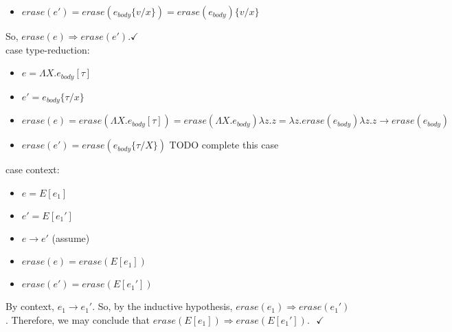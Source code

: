 \documentclass[10pt]{article}
\begin{document}
\begin{exercise}
\begin{itemize}
\item $\mathit{erase}(e') = \mathit{erase}(e_{body} \{v/x\}) = \mathit{erase}(e_{body})\{v/x\}$\\

\end{itemize}

So, $\mathit{erase}(e) \Rightarrow \mathit{erase}(e'). \checkmark$ \\

{\sc case type-reduction}:

\begin{itemize}
\item $e = \Lambda X. e_{body} [\tau]$
\item $e' = e_{body} \{\tau / x\}$
\item $\mathit{erase}(e) = \mathit{erase}(\Lambda X. e_{body}[\tau]) = \mathit{erase}(\Lambda X. e_{body}) \lambda z.z = \lambda z.\mathit{erase}(e_{body}) \lambda z. z \rightarrow \mathit{erase}(e_{body})$
\item $\mathit{erase}(e') = \mathit{erase}(e_{body} \{\tau/X\})$ TODO complete this case
\end{itemize}


{\sc case context}: 
\begin{itemize}
\item $e = E[e_1]$
\item $e' = E[e_1']$
\item $e \rightarrow e'$ (assume)
\item $\mathit{erase}(e) = \mathit{erase}(E[e_1])$
\item $\mathit{erase}(e') = \mathit{erase}(E[e_1'])$
\end{itemize}

By {\sc context}, $e_1 \rightarrow e_1'$. So, by the inductive hypothesis, $\mathit{erase}(e_1) \Rightarrow \mathit{erase}(e_1')$. Therefore, we may conclude that $\mathit{erase}(E[e_1]) \Rightarrow \mathit{erase}(E[e_1']). \texttt{ } \checkmark$ 


  

\end{exercise}
\end{document}
